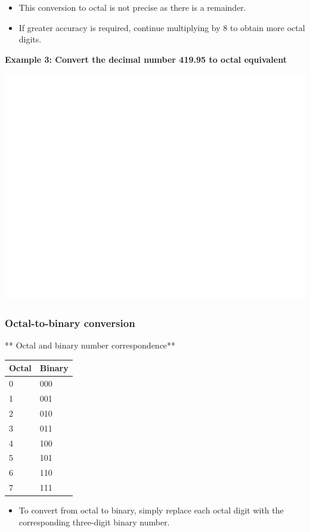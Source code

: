 \documentclass[]{book}
\providecommand{\tightlist}{%
  \setlength{\itemsep}{0pt}\setlength{\parskip}{0pt}}
\begin{document}
\begin{itemize}
\tightlist
\item
  This conversion to octal is not precise as there is a remainder.
\item
  If greater accuracy is required, continue multiplying by 8 to obtain more octal digits.
\end{itemize}

\textbf{Example 3: Convert the decimal number 419.95 to octal equivalent}

\begin{center}\includegraphics[width=1\linewidth]{figure/NSbox12-1} \end{center}

\hypertarget{octal-to-binary-conversion}{%
\subsubsection{Octal-to-binary conversion}\label{octal-to-binary-conversion}}

** Octal and binary number correspondence**

\begin{longtable}[]{@{}ll@{}}
\toprule
Octal & Binary\tabularnewline
\midrule
\endhead
0 & 000\tabularnewline
1 & 001\tabularnewline
2 & 010\tabularnewline
3 & 011\tabularnewline
4 & 100\tabularnewline
5 & 101\tabularnewline
6 & 110\tabularnewline
7 & 111\tabularnewline
\bottomrule
\end{longtable}

\begin{itemize}
\tightlist
\item
  To convert from octal to binary, simply replace each octal digit with the corresponding three-digit binary number.
\end{itemize}
\end{document}
